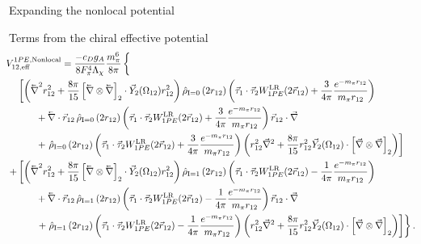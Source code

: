 \begin{section}{Expanding the nonlocal potential}
\begin{subsection}{Terms from the chiral effective potential}
\begin{align}
&\hspace{-.4cm}V^{1PE,\text{Nonlocal}}_{12,\text{eff}}= \frac{-c_D g_A}{8F_\pi^4 \Lambda_\chi}\frac{m_\pi^6}{8\pi} \left\{\phantom{\frac{-c_D g_Am_\pi^6}{8 F_\pi^4 \Lambda_\chi}}\right.\\
&\left[\left(\lvec{\nabla}^2r_{12}^2+\frac{8\pi}{15}\left[\lvec{\nabla}\otimes \lvec{\nabla}\right]_2\cdot \vec{Y}_2(\Omega_{12})r_{12}^2 \right) \rhohat{0}{2 r_{12}}\left(\taudot W^{\text{LR}}_{1PE}(2\rot)+\frac{3}{4\pi}\yukawadimless{r_{12}} \right)\right. \\
%
&\hspace{.7cm}+\lvec{\nabla}\cdot\vec{r}_{12} \,\rhohat{0}{2 r_{12}} \left(\taudot W^{\text{LR}}_{1PE}(2\rot)+\frac{3}{4\pi}\yukawadimless{r_{12}} \right)\vec{r}_{12}\cdot\vec{\nabla} \\
%
&\hspace{.7cm}+\left.\rhohat{0}{2 r_{12}} \left(\taudot W^{\text{LR}}_{1PE}(2\rot)+\frac{3}{4\pi}\yukawadimless{r_{12}} \right)\left(r_{12}^2 \vec{\nabla}^2+\frac{8\pi}{15}r_{12}^2\vec{Y}_2(\Omega_{12})\cdot\left[\vec{\nabla}\otimes \vec{\nabla}\right]_2 \right)\right] \\
%
%
+&\left[\left(\lvec{\nabla}^2r_{12}^2+\frac{8\pi}{15}\left[\lvec{\nabla}\otimes \lvec{\nabla}\right]_2\cdot \vec{Y}_2(\Omega_{12})r_{12}^2 \right) \rhohat{1}{2 r_{12}} \left(\taudot W^{\text{LR}}_{1PE}(2\rot)-\frac{1}{4\pi}\yukawadimless{r_{12}} \right)\right. \\
%
&\hspace{.7cm}+\lvec{\nabla}\cdot\vec{r}_{12}\, \rhohat{1}{2 r_{12}} \left(\taudot W^{\text{LR}}_{1PE}(2\rot)-\frac{1}{4\pi}\yukawadimless{r_{12}} \right)\vec{r}_{12}\cdot\vec{\nabla} \\
%
&\left.\hspace{.7cm}+\left.\rhohat{1}{2 r_{12}}\left(\taudot W^{\text{LR}}_{1PE}(2\rot)-\frac{1}{4\pi}\yukawadimless{r_{12}} \right)\left(r_{12}^2 \vec{\nabla}^2+\frac{8\pi}{15}r_{12}^2\vec{Y}_2(\Omega_{12})\cdot\left[\vec{\nabla}\otimes \vec{\nabla}\right]_2 \right)\right]\right\}.
\end{align}


\end{subsection}
\end{section}
